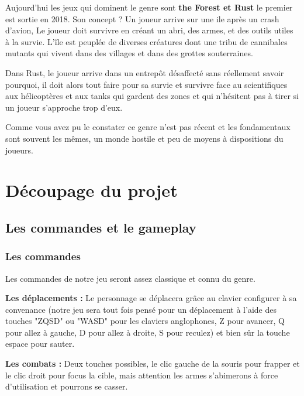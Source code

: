 \documentclass{article}
\begin{document}
\par
Aujourd'hui les jeux qui dominent le genre sont \textbf{the Forest et Rust}  le premier est sortie en 2018. Son concept ? Un joueur arrive sur une ile après un crash d'avion, Le joueur doit survivre en créant un abri, des armes, et des outils utiles à la survie. L'île est peuplée de diverses créatures dont une tribu de cannibales mutants qui vivent dans des villages et dans des grottes souterraines. 
\newline
\par 
Dans Rust, le joueur arrive dans un entrepôt désaffecté  sans réellement savoir pourquoi, il doit alors tout faire pour sa survie  et survivre face au scientifiques aux hélicoptères et aux tanks qui gardent des zones et qui n’hésitent pas à tirer si un joueur s’approche trop d’eux.
\newline

\par 
Comme vous avez pu le constater ce genre n'est pas récent et les fondamentaux sont souvent les mêmes, un monde hostile et peu de moyens à dispositions du joueurs.
\newline


\newpage
\section{Découpage du projet}
\subsection{Les commandes et le gameplay}
\subsubsection{Les commandes}

\par
Les commandes de notre jeu seront assez classique et connu du genre.
\newline

\par
\textbf{Les déplacements :} Le personnage se déplacera grâce au clavier configurer à sa convenance (notre jeu sera tout fois pensé pour un déplacement à l'aide des touches "ZQSD" ou "WASD" pour les claviers anglophones, Z pour avancer, Q pour allez à gauche, D pour allez à droite, S pour reculez) et bien sûr la touche espace pour sauter.
\newline

\par
\textbf{Les combats :} Deux touches possibles, le clic gauche de la souris pour frapper et le clic droit pour focus la cible, mais attention les armes s'abimerons à force d'utilisation et pourrons se casser.
\newline
\end{document}
